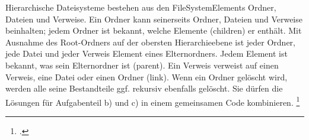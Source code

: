 \documentclass{bschlangaul-aufgabe}
\begin{document}

Hierarchische Dateisysteme bestehen aus den FileSystemElements Ordner,
Dateien und Verweise. Ein Ordner kann seinerseits Ordner, Dateien und
Verweise beinhalten; jedem Ordner ist bekannt, welche Elemente
(children) er enthält. Mit Ausnahme des Root-Ordners auf der obersten
Hierarchieebene ist jeder Ordner, jede Datei und jeder Verweis Element
eines Elternordners. Jedem Element ist bekannt, was sein Elternordner
ist (parent). Ein Verweis verweist auf einen Verweis, eine Datei oder
einen Ordner (link). Wenn ein Ordner gelöscht wird, werden alle seine
Bestandteile ggf. rekursiv ebenfalls gelöscht. Sie dürfen die Lösungen
für Aufgabenteil b) und c) in einem gemeinsamen Code kombinieren.
\footcite{examen:66116:2019:09}
\end{document}
